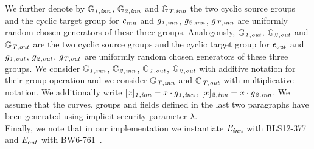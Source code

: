 \noindent We further denote by $\mathbb{G}_{\mathit{1,inn}}$, $\mathbb{G}_{\mathit{2,inn}}$ and $\mathbb{G}_{\mathit{T,inn}}$ the two cyclic source groups and the cyclic target group for $\mathit{e}_{\mathit{inn}}$ 
and $g_{\mathit{1,inn}}$, $g_{\mathit{2,inn}}$, $g_{\mathit{T,inn}}$ are uniformly random chosen generators of these three groups. Analogously, $\mathbb{G}_{\mathit{1,out}}$, 
$\mathbb{G}_{\mathit{2,out}}$ and $\mathbb{G}_{\mathit{T,out}}$ are the two cyclic source groups and the cyclic target group for $\mathit{e}_{\mathit{out}}$ and $g_{\mathit{1,out}}$, $g_{\mathit{2,out}}$, $g_{\mathit{T,out}}$ 
are uniformly random chosen generators of these three groups. We consider $\mathbb{G}_{\mathit{1,inn}}$, $\mathbb{G}_{\mathit{2,inn}}$, $\mathbb{G}_{\mathit{1,out}}$, $\mathbb{G}_{\mathit{2,out}}$ 
with additive notation for their group operation and we consider $\mathbb{G}_{\mathit{T,inn}}$ and $\mathbb{G}_{\mathit{T,out}}$ with multiplicative notation. 
We additionally write $[x]_{\mathit{1,inn}} = x \cdot g_{\mathit{1,inn}}$, $[x]_{\mathit{2,inn}} = x \cdot g_{\mathit{2,inn}}$. 
We assume that the curves, groups and fields defined in the last two paragraphs have been 
generated using implicit security parameter $\lambda$. \\

\noindent Finally, we note that in our implementation we instantiate $\mathit{E}_{\mathit{inn}}$ with BLS12-377~\cite{zexe} and $\mathit{E}_{\mathit{out}}$ with BW6-761~\cite{BW6}.



